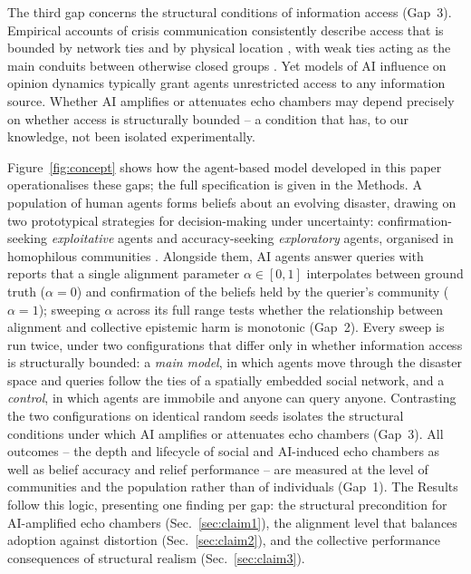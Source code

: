\documentclass[sn-apacite]{sn-jnl}
\begin{document}
The third gap concerns the structural conditions of information access (Gap~3). Empirical accounts of crisis communication consistently describe access that is bounded by network ties and by physical location \citep{pan2012crisis,holguin2012unique,wolbers2018introducing}, with weak ties acting as the main conduits between otherwise closed groups \citep{granovetter1973strength}. Yet models of AI influence on opinion dynamics typically grant agents unrestricted access to any information source. Whether AI amplifies or attenuates echo chambers may depend precisely on whether access is structurally bounded -- a condition that has, to our knowledge, not been isolated experimentally.

Figure~\ref{fig:concept} shows how the agent-based model developed in this paper operationalises these gaps; the full specification is given in the Methods. A population of human agents forms beliefs about an evolving disaster, drawing on two prototypical strategies for decision-making under uncertainty: confirmation-seeking \emph{exploitative} agents and accuracy-seeking \emph{exploratory} agents, organised in homophilous communities \citep{mcpherson2001birds,comes2020coordination}. Alongside them, AI agents answer queries with reports that a single alignment parameter $\alpha \in [0,1]$ interpolates between ground truth ($\alpha = 0$) and confirmation of the beliefs held by the querier's community ($\alpha = 1$); sweeping $\alpha$ across its full range tests whether the relationship between alignment and collective epistemic harm is monotonic (Gap~2). Every sweep is run twice, under two configurations that differ only in whether information access is structurally bounded: a \emph{main model}, in which agents move through the disaster space and queries follow the ties of a spatially embedded social network, and a \emph{control}, in which agents are immobile and anyone can query anyone. Contrasting the two configurations on identical random seeds isolates the structural conditions under which AI amplifies or attenuates echo chambers (Gap~3). All outcomes -- the depth and lifecycle of social and AI-induced echo chambers as well as belief accuracy and relief performance -- are measured at the level of communities and the population rather than of individuals (Gap~1). The Results follow this logic, presenting one finding per gap: the structural precondition for AI-amplified echo chambers (Sec.~\ref{sec:claim1}), the alignment level that balances adoption against distortion (Sec.~\ref{sec:claim2}), and the collective performance consequences of structural realism (Sec.~\ref{sec:claim3}).
\end{document}
